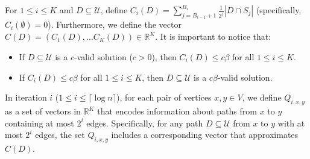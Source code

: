 \documentclass[11pt,a4paper]{article} \usepackage{enumitem}
\newcommand{\calU}{\mathcal{U}}
\theoremstyle{definition}
\begin{document}
For $1\le i\le K$ and $D\subseteq \calU$, define $C_i(D)=\sum_{j=B_{i-1}+1}^{B_i} \frac{1}{2^j} |D\cap S_{j}|$ (specifically,  $C_i(\emptyset)=0$). Furthermore, we define the vector $C(D)=(C_1(D),\ldots C_{K}(D))\in \mathbb{R}^{K}$. 
It is important to notice that:
\begin{itemize}
    \item If $D\subseteq\calU$ is a $c$-valid solution ($c>0$), then $C_i(D)\le c\beta$ for all $1\le i\le K$.
    \item If $C_i(D)\le c\beta$ for all $1\le i\le K$, then $D\subseteq\calU$ is a $c\beta$-valid solution.
\end{itemize}

In iteration \( i \) (\( 1 \leq i \leq \lceil \log n \rceil \)), for each pair of vertices \( x, y \in V \), we define \( Q_{i, x, y} \) as a set of vectors in \( \mathbb{R}^{K} \) that encodes information about paths from \( x \) to \( y \) containing at most \( 2^i \) edges. Specifically, for any path \( D \subseteq \mathcal{U} \) from \( x \) to \( y \) with at most \( 2^i \) edges, the set \( Q_{i, x, y} \) includes a corresponding vector that approximates \( C(D) \).
\end{document}
